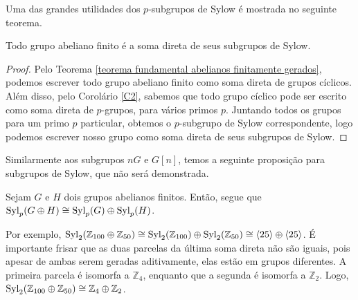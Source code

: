     	\par\vspace{0.3cm} Uma das grandes utilidades dos $p$-subgrupos de Sylow é mostrada no seguinte teorema.
    	\begin{theorem}
    	\label{subgrupos de Sylow e abelianos}
    		Todo grupo abeliano finito é a soma direta de seus subgrupos de Sylow.
    	\end{theorem}
    	\begin{proof}
    		Pelo Teorema \eqref{teorema fundamental abelianos finitamente gerados}, podemos escrever 
    		todo grupo abeliano finito como soma direta de grupos cíclicos. Além disso, pelo 
    		Corolário \eqref{C2}, sabemos que todo grupo cíclico pode ser escrito como soma direta de $p$-grupos,
    		para vários primos $p$. Juntando todos os grupos para um primo $p$ particular, obtemos o 
    		$p$-subgrupo de Sylow correspondente, logo podemos escrever nosso grupo como soma direta de 
    		seus subgrupos de Sylow.
    	\end{proof}
    	\par\vspace{0.3cm} Similarmente aos subgrupos $nG$ e $G[n]$, temos a seguinte proposição para 
    	subgrupos de Sylow, que não será demonstrada.
    	\begin{prop}
    	\label{Sylow da soma direta}
    		Sejam $G$ e $H$ dois grupos abelianos finitos. Então, segue que 
    		$\operatorname{Syl}_p(G\oplus H)\cong \operatorname{Syl}_p(G)\oplus\operatorname{Syl}_p(H)$.
    	\end{prop}
    	\par\vspace{0.3cm} Por exemplo, $\operatorname{Syl}_2(\mathbb{Z}_{100}\oplus\mathbb{Z}_{50}) 
    	\cong \operatorname{Syl}_2(\mathbb{Z}_{100})\oplus\operatorname{Syl}_2(\mathbb{Z}_{50})
    	\cong \langle 25 \rangle \oplus \langle 25 \rangle$. É importante frisar que as duas parcelas 
    	da última soma direta não são iguais, pois apesar de ambas serem geradas aditivamente, elas estão em
    	grupos diferentes. A primeira parcela é isomorfa a $\mathbb{Z}_4$, enquanto que a segunda é isomorfa a
    	$\mathbb{Z}_2$. Logo, $\operatorname{Syl}_2(\mathbb{Z}_{100}\oplus\mathbb{Z}_{50})\cong\mathbb{Z}_4\oplus\mathbb{Z}_2$.
    	

